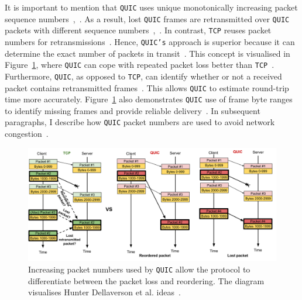 \documentclass[12pt,a4paper]{report}
\begin{document}
    
    
    
    It is important to mention that \texttt{QUIC} uses unique monotonically increasing packet sequence numbers~\cite{UnderstandQUIC, The_QUIC_Transport_Protocol_Design_and_Internet-Scale_Deployment},~\cite[Section~4.2]{ietf-quic-recovery-32}.
    As a result, lost \texttt{QUIC} frames are retransmitted over \texttt{QUIC} packets with different sequence numbers~\cite[Section~4]{ietf-quic-recovery-32},~\cite{UnderstandQUIC}.
    In contrast, \texttt{TCP} reuses packet numbers for retransmissions~\cite[Section~4]{ietf-quic-recovery-32}.
    Hence, \texttt{QUIC's} approach is superior because it can determine the exact number of packets in transit~\cite{UnderstandQUIC}.
    This concept is visualised in Figure~\ref{fig:Impact_of_increasing_pkt_numbers}, where \texttt{QUIC} can cope with repeated packet loss better than \texttt{TCP}~\cite{UnderstandQUIC}.
    Furthermore, \texttt{QUIC}, as opposed to \texttt{TCP}, can identify whether or not a received packet contains retransmitted frames~\cite{UnderstandQUIC}.
    This allows \texttt{QUIC} to estimate round-trip time more accurately.
    Figure~\ref{fig:Impact_of_increasing_pkt_numbers} also demonstrates \texttt{QUIC} use of frame byte ranges to identify missing frames and provide reliable delivery~\cite{UnderstandQUIC}.
    In subsequent paragraphs, I describe how \texttt{QUIC} packet numbers are used to avoid network congestion~\cite{UnderstandQUIC}.
    
    \begin{figure}[ht]
    \centering
    \includegraphics[width=\textwidth]{figs/Impact_of_increasing_pkt_numbers.png}
    \caption[Increasing packet numbers used by \texttt{QUIC} allow the protocol to differentiate between the packet loss and reordering]{Increasing packet numbers used by \texttt{QUIC} allow the protocol to differentiate between the packet loss and reordering. The diagram visualises Hunter Dellaverson et al. ideas~\cite{UnderstandQUIC}.}
    \label{fig:Impact_of_increasing_pkt_numbers}
    \end{figure}
    
\end{document}
